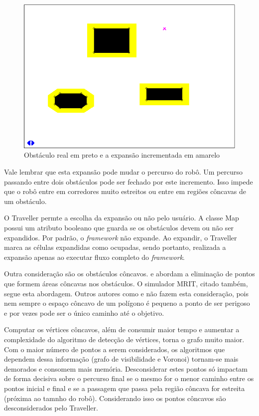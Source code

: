 \begin{figure}[h]
	\centering
	\label{fig34}
		\includegraphics[keepaspectratio=true,scale=0.5]{figuras/expansao.png}
	\caption{Obstáculo real em preto e a expansão incrementada em amarelo \cite{MRIT_SITE}}
\end{figure}

Vale lembrar que esta expansão pode mudar o percurso do robô. Um percurso passando entre dois obstáculos pode ser fechado por este incremento. Isso impede que o robô entre em corredores muito estreitos ou entre em regiões côncavas de um obstáculo.

O Traveller permte a escolha da expansão ou não pelo usuário. A classe Map possui um atributo booleano que guarda se os obstáculos devem ou não ser expandidos. Por padrão, o \textit{framework} não expande. Ao expandir, o Traveller marca as células expandidas como ocupadas, sendo portanto, realizada a expansão apenas ao executar fluxo completo do \textit{framework}.

Outra consideração são os obstáculos côncavos. \cite{Siegwart2004} e \cite{Guzman2008} abordam a eliminação de pontos que formem áreas côncavas nos obstáculos. O simulador MRIT, citado também, segue esta abordagem. Outros autores como \cite{Thomsen2010} e \cite{Choset2005} não fazem esta consideração, pois nem sempre o espaço côncavo de um polígono é pequeno a ponto de ser perigoso e por vezes pode ser o único caminho até o objetivo. 

Computar os vértices côncavos, além de consumir maior tempo e aumentar a complexidade do algoritmo de detecção de vértices, torna o grafo muito maior. Com o maior número de pontos a serem considerados, os algoritmos que dependem dessa informação (grafo de visibilidade e Voronoi) tornam-se mais demorados e consomem mais memória. Desconsiderar estes pontos só impactam de forma decisiva sobre o percurso final se o mesmo for o menor caminho entre os pontos inicial e final e se a passagem que passa pela região côncava for estreita (próxima ao tamnho do robô). Considerando isso os pontos côncavos são desconsiderados pelo Traveller.

